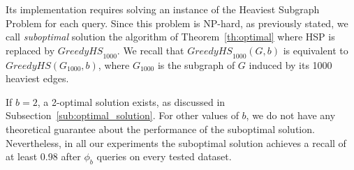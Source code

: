 \documentclass[sigconf, nonacm]{acmart}
\newcommand{\window}{b}
\begin{document}
Its implementation requires solving an instance of the Heaviest Subgraph Problem for each query. Since this problem is NP-hard, as previously stated, we call \emph{suboptimal} solution the algorithm of Theorem~\ref{th:optimal} where HSP is replaced by  $\textit{GreedyHS}_{1000}$. We recall that $\textit{GreedyHS}_{1000}(G,b)$ is equivalent to $\textit{GreedyHS}(G_{1000},b)$, where $G_{1000}$ is the subgraph of $G$ induced by its 1000 heaviest edges. 

If $\window = 2$, a 2-optimal solution exists, as discussed in Subsection~\ref{sub:optimal_solution}. For other values of $\window$, we do not have any theoretical guarantee about the performance of the suboptimal solution. Nevertheless, in all our experiments the suboptimal solution achieves a recall of at least 0.98  after $\phi_{\window}$ queries on every tested dataset.
\end{document}
